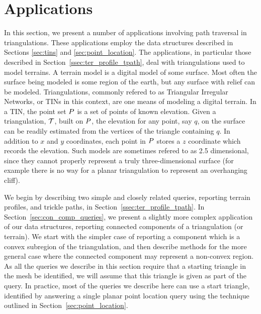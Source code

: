   \section{Applications}
  \label{sec:applications}

  In this section, we present a number of applications involving path traversal
  in triangulations.
  These applications employ the data structures described in Sections \ref{sec:tins}
  and \ref{sec:point_location}.
  The applications, in particular those described in 
  Section~\ref{ssec:ter_profile_tpath}, deal with triangulations used to model 
  terrains.
  A terrain model is a digital model of some surface.
  Most often the surface being modeled is some region of the earth, but any surface
  with relief can be modeled.
  Triangulations, commonly refered to as Triangular Irregular Networks, or TINs 
  in this context, are one means of modeling a digital terrain.
  In a TIN, the point set $P$ is a set of points of known elevation. 
  Given a triangulation, $\mathcal{T}$, built on $P$, the elevation for any
  point, say $q$, on the surface can be readily estimated from the vertices
  of the triangle containing $q$.
  In addition to $x$ and $y$ coordinates, each point in $P$ stores a $z$
  coordinate which records the elevation.
  Such models are sometimes refered to as 2.5 dimensional, since they cannot 
  properly represent a truly three-dimensional surface (for example there is no
  way for a planar triangulation to represent an overhanging cliff). 

  We begin by describing two simple and closely related queries, 
  reporting terrain profiles, and trickle paths, in 
  Section~\ref{ssec:ter_profile_tpath}.  
  In Section~\ref{sec:con_comp_queries}, we present a slightly more complex 
  application of our data structures, 
  reporting connected components of a triangulation (or terrain). 
  We start with the simpler case of reporting a component which is a convex
  subregion of the triangulation, and then describe methods for the more 
  general case where the connected component may represent a non-convex region.
  As all the queries we describe in this section require that a starting 
  triangle in the mesh be identified, we will assume that this triangle
  is given as part of the query.
  In practice, most of the queries we describe here can use a start triangle,
  identified by answering a
  single planar point location query using the technique outlined in 
  Section~\ref{sec:point_location}.

